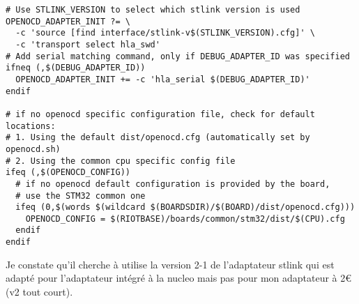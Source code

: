 {\begin{verbatim}
# Use STLINK_VERSION to select which stlink version is used
OPENOCD_ADAPTER_INIT ?= \
  -c 'source [find interface/stlink-v$(STLINK_VERSION).cfg]' \
  -c 'transport select hla_swd'
# Add serial matching command, only if DEBUG_ADAPTER_ID was specified
ifneq (,$(DEBUG_ADAPTER_ID))
  OPENOCD_ADAPTER_INIT += -c 'hla_serial $(DEBUG_ADAPTER_ID)'
endif

# if no openocd specific configuration file, check for default locations:
# 1. Using the default dist/openocd.cfg (automatically set by openocd.sh)
# 2. Using the common cpu specific config file
ifeq (,$(OPENOCD_CONFIG))
  # if no openocd default configuration is provided by the board,
  # use the STM32 common one
  ifeq (0,$(words $(wildcard $(BOARDSDIR)/$(BOARD)/dist/openocd.cfg)))
    OPENOCD_CONFIG = $(RIOTBASE)/boards/common/stm32/dist/$(CPU).cfg
  endif
endif
\end{verbatim}
}
Je constate qu'il cherche à utilise la version 2-1 de l'adaptateur stlink qui est
adapté pour l'adaptateur intégré à la nucleo mais pas pour mon adaptateur à 2\euro
(v2 tout court).\\

